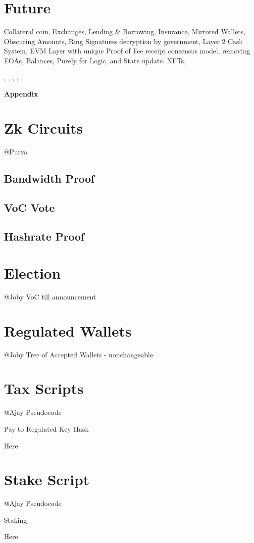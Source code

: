 \documentclass[a4paper,10pt]{article}
\begin{document}
\section{Future}

Collateral coin, Exchanges, Lending \& Borrowing, Insurance, Mirrored Wallets, Obscuring Amounts, Ring Signatures decryption by government, Layer 2 Cash System, EVM Layer with unique Proof of Fee receipt consensus model, removing EOAs, Balances, Purely for Logic, and State update. NFTs,\\
\begin{center}
\nocite{nakamoto2008bitcoin}, \nocite{poon2016bitcoin} , \nocite{yakovenko2018solana}, \nocite{wood2014ethereum}, \nocite{rai2020}, \nocite{Stateful}
\end{center}




\appendix
\noindent \Large \textbf{Appendix}
\normalsize
\section{Zk Circuits}
@Purva
\subsection{Bandwidth Proof}
\subsection{VoC Vote}
\subsection{Hashrate Proof}
\section{Election}
@Joby VoC till announcement
\section{Regulated Wallets}
@Joby Tree of Accepted Wallets - nonchangeable
\section{Tax Scripts}
@Ajay Pseudocode
\begin{algorithm}
\caption{Pay to Regulated Key Hash}
Here
\end{algorithm}
\section{Stake Script}
@Ajay Pseudocode
\begin{algorithm}
\caption{Staking}
Here
\end{algorithm}
\end{document}
